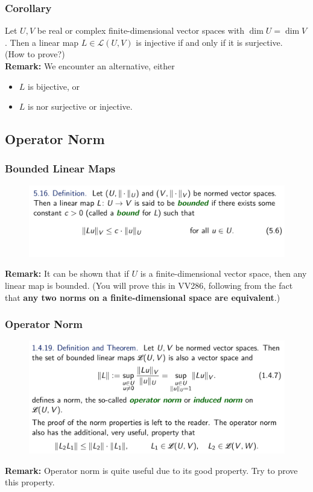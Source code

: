\documentclass[12pt, t]{beamer}
\newcommand{\nullspace}{~\\[15pt]}
\newcommand{\remark}{\textbf{Remark: }}
\begin{document}
\begin{frame}
    \frametitle{Corollary}
    Let $U,V$ be real or complex finite-dimensional vector spaces with $\dim U=\dim V$. Then a linear map $L\in\mathcal{L}(U,V)$ is injective if and only if it is surjective.
    \nullspace
    (How to prove?)
    \nullspace
    \remark We encounter an alternative, either
    \begin{itemize}
        \item $L$ is bijective, or
        \item $L$ is nor surjective or injective.
    \end{itemize}
\end{frame}

\subsection{Operator Norm}
\begin{frame}
    \frametitle{Bounded Linear Maps}
    \begin{figure}[H]
        \centering
        \includegraphics[width=\textwidth]{2020-05-25-17-16-51.png}
    \end{figure}

    \remark  It can be shown that if $U$ is a finite-dimensional vector space, then any linear map is bounded. (You will prove this in VV286, following from the fact that \textbf{any two norms on a finite-dimensional space are equivalent}.)
\end{frame}

\begin{frame}
    \frametitle{Operator Norm}
    \begin{figure}[H]
        \centering
        \includegraphics[width=\textwidth]{2020-05-25-17-34-13.png}
    \end{figure}

    \remark Operator norm is quite useful due to its good property. Try to prove this property.
\end{frame}
\end{document}
